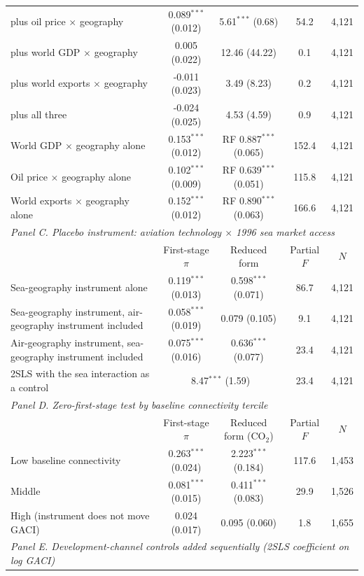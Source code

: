 \documentclass[12pt]{article}
\begin{document}
\begin{table}[htbp]
\begin{threeparttable}
\begin{tabular}{lcccc}
  \quad plus oil price $\times$ geography & 0.089$^{***}$ (0.012) & 5.61$^{***}$ (0.68) & 54.2 & 4,121 \\
  \quad plus world GDP $\times$ geography & 0.005 (0.022) & 12.46 (44.22) & 0.1 & 4,121 \\
  \quad plus world exports $\times$ geography & -0.011 (0.023) & 3.49 (8.23) & 0.2 & 4,121 \\
  \quad plus all three & -0.024 (0.025) & 4.53 (4.59) & 0.9 & 4,121 \\
  World GDP $\times$ geography alone & 0.153$^{***}$ (0.012) & RF 0.887$^{***}$ (0.065) & 152.4 & 4,121 \\
  Oil price $\times$ geography alone & 0.102$^{***}$ (0.009) & RF 0.639$^{***}$ (0.051) & 115.8 & 4,121 \\
  World exports $\times$ geography alone & 0.152$^{***}$ (0.012) & RF 0.890$^{***}$ (0.063) & 166.6 & 4,121 \\
\midrule
\multicolumn{5}{l}{\textit{Panel C. Placebo instrument: aviation technology $\times$ 1996 sea market access}} \\
 & First-stage $\pi$ & Reduced form & Partial $F$ & $N$ \\
  Sea-geography instrument alone & 0.119$^{***}$ (0.013) & 0.598$^{***}$ (0.071) & 86.7 & 4,121 \\
  Sea-geography instrument, air-geography instrument included & 0.058$^{***}$ (0.019) & 0.079 (0.105) & 9.1 & 4,121 \\
  Air-geography instrument, sea-geography instrument included & 0.075$^{***}$ (0.016) & 0.636$^{***}$ (0.077) & 23.4 & 4,121 \\
  \quad 2SLS with the sea interaction as a control & \multicolumn{2}{c}{8.47$^{***}$ (1.59)} & 23.4 & 4,121 \\
\midrule
\multicolumn{5}{l}{\textit{Panel D. Zero-first-stage test by baseline connectivity tercile}} \\
 & First-stage $\pi$ & Reduced form (CO$_2$) & Partial $F$ & $N$ \\
  Low baseline connectivity & 0.263$^{***}$ (0.024) & 2.223$^{***}$ (0.184) & 117.6 & 1,453 \\
  Middle & 0.081$^{***}$ (0.015) & 0.411$^{***}$ (0.083) & 29.9 & 1,526 \\
  High (instrument does not move GACI) & 0.024 (0.017) & 0.095 (0.060) & 1.8 & 1,655 \\
\midrule
\multicolumn{5}{l}{\textit{Panel E. Development-channel controls added sequentially (2SLS coefficient on log GACI)}} \\

\end{tabular}
\end{threeparttable}
\end{table}
\end{document}
